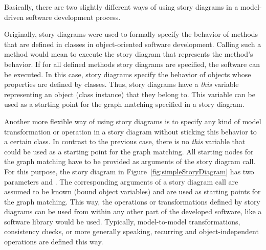 
Basically, there are two slightly different ways of using story diagrams in a model-driven software development process.

Originally, story diagrams were used to formally specify the behavior of methods that are defined in classes in object-oriented software development.
Calling such a method would mean to execute the story diagram that represents the method's behavior.
If for all defined methods story diagrams are specified, the software can be executed.
In this case, story diagrams specify the behavior of objects whose properties are defined by classes.
Thus, story diagrams have a \emph{this} variable representing an object (class instance) that they belong to.
This variable can be used as a starting point for the graph matching specified in a story diagram.

Another more flexible way of using story diagrams is to specify any kind of model transformation or operation in a story diagram without sticking this behavior to a certain class.
In contrast to the previous case, there is no \emph{this} variable that could be used as a starting point for the graph matching.
All starting nodes for the graph matching have to be provided as arguments of the story diagram call.
For this purpose, the story diagram in Figure~\ref{fig:simpleStoryDiagram} has two parameters  and .
The corresponding arguments of a story diagram call are assumed to be known (bound object variables) and are used as starting points for the graph matching.
This way, the operations or transformations defined by story diagrams can be used from within any other part of the developed software, like a software library would be used.
Typically, model-to-model transformations, consistency checks, or more generally speaking, recurring and object-independent operations are defined this way.

